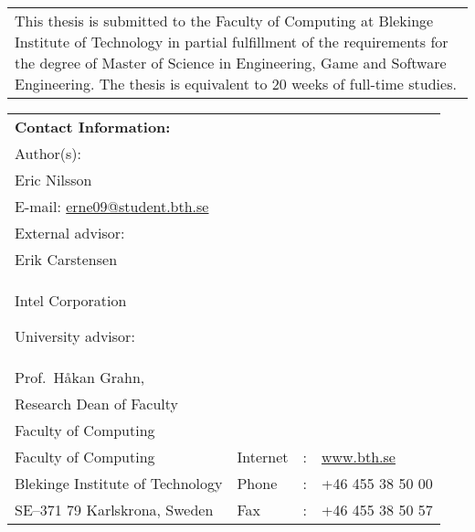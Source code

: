 {\pagestyle{empty}
\changepage{5cm}{1cm}{-0.5cm}{-0.5cm}{}{-2cm}{}{}{}
\noindent%
\begin{tabular}{p{\textwidth}}
{\small This thesis is submitted to the Faculty of Computing at Blekinge
Institute of Technology in partial fulfillment of the requirements for the degree of Master of Science in Engineering, Game and Software Engineering. The thesis is equivalent to $20$ weeks of
full-time studies.}
\end{tabular}

\par\vspace {14cm}

\noindent%
\begin{tabular}{p{}lcl}
\textbf{Contact Information:}\\
Author(s):\\
Eric Nilsson\\
E-mail: \href{mailto:erne09@student.bth.se}{erne09@student.bth.se} \\ %
\par\vspace {0.5cm}
External advisor:\\
Erik Carstensen\\
Intel Corporation
\par\vspace {0.5cm}
University advisor:\\
Prof.\ Håkan Grahn,\\
Research Dean of Faculty\\
Faculty of Computing

\par\vspace {0.5cm}

\noindent%
 \\
Faculty of Computing & Internet & : & \href{http://www.bth.se}{www.bth.se}\\
Blekinge Institute of Technology & Phone	& : & +46 455 38 50 00 \\
SE--371 79 Karlskrona, Sweden & Fax & : & +46 455 38 50 57 \\
\end{tabular}
\clearpage
} %

\setcounter{page}{1}
